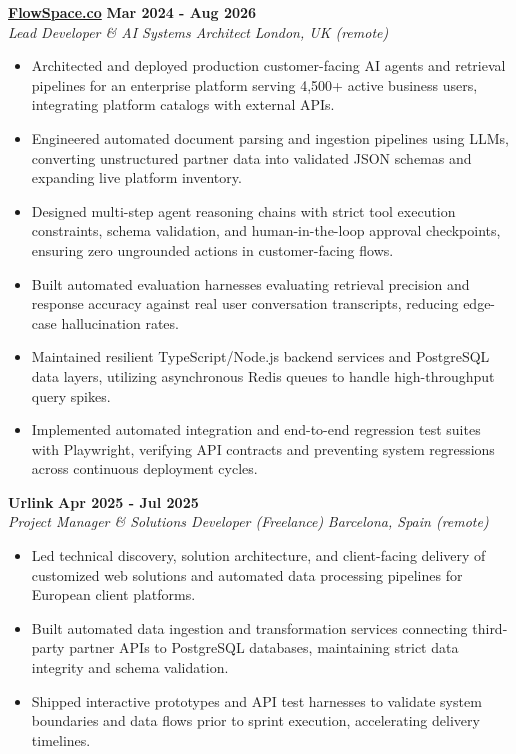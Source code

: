 \documentclass[10pt,a4paper]{article}
\newcommand{\role}[4]{%
  \textbf{#1} \hfill \textbf{#2}\\[1pt]%
  \textit{#3} \hfill \textit{#4}\\[2pt]%
}
\begin{document}
\role{\href{https://flowspace.co}{FlowSpace.co}}{Mar 2024 - Aug 2026}{Lead Developer \& AI Systems Architect}{London, UK (remote)}
\begin{itemize}
  \item Architected and deployed production customer-facing AI agents and retrieval pipelines for an enterprise platform serving 4,500+ active business users, integrating platform catalogs with external APIs.
  \item Engineered automated document parsing and ingestion pipelines using LLMs, converting unstructured partner data into validated JSON schemas and expanding live platform inventory.
  \item Designed multi-step agent reasoning chains with strict tool execution constraints, schema validation, and human-in-the-loop approval checkpoints, ensuring zero ungrounded actions in customer-facing flows.
  \item Built automated evaluation harnesses evaluating retrieval precision and response accuracy against real user conversation transcripts, reducing edge-case hallucination rates.
  \item Maintained resilient TypeScript/Node.js backend services and PostgreSQL data layers, utilizing asynchronous Redis queues to handle high-throughput query spikes.
  \item Implemented automated integration and end-to-end regression test suites with Playwright, verifying API contracts and preventing system regressions across continuous deployment cycles.
\end{itemize}

\role{Urlink}{Apr 2025 - Jul 2025}{Project Manager \& Solutions Developer (Freelance)}{Barcelona, Spain (remote)}
\begin{itemize}
  \item Led technical discovery, solution architecture, and client-facing delivery of customized web solutions and automated data processing pipelines for European client platforms.
  \item Built automated data ingestion and transformation services connecting third-party partner APIs to PostgreSQL databases, maintaining strict data integrity and schema validation.
  \item Shipped interactive prototypes and API test harnesses to validate system boundaries and data flows prior to sprint execution, accelerating delivery timelines.
\end{itemize}
\end{document}
